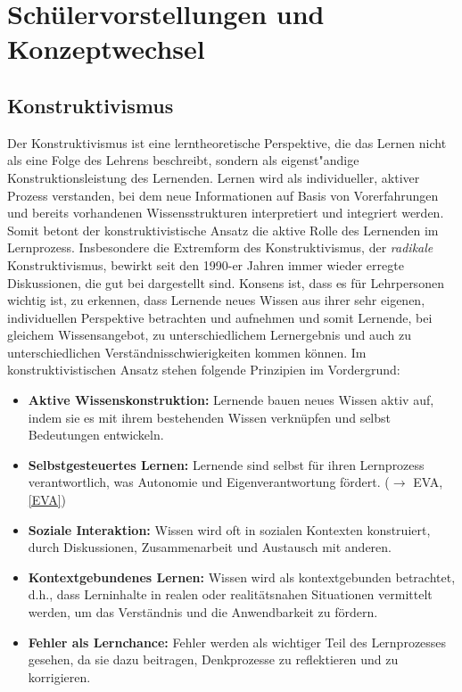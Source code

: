 \chapter{Sch{\"u}lervorstellungen und Konzeptwechsel}\label{Schuelervorstellungen}


\section{Konstruktivismus}\label{Konstruktivismus}

Der Konstruktivismus ist eine lerntheoretische Perspektive, die das Lernen nicht als eine Folge des Lehrens beschreibt, sondern als eigenst"{a}ndige Konstruktionsleistung des Lernenden. Lernen wird als individueller, aktiver Prozess verstanden, bei dem neue Informationen auf Basis von Vorerfahrungen und bereits vorhandenen Wissensstrukturen interpretiert und integriert werden. Somit betont der konstruktivistische Ansatz  die aktive Rolle des Lernenden im Lernprozess. Insbesondere die Extremform des Konstruktivismus, der \emph{radikale} Konstruktivismus, bewirkt  seit den 1990-er Jahren immer wieder erregte Diskussionen, die gut bei \textcite{JankMeyer} dargestellt sind. Konsens ist, dass es f\"{u}r Lehrpersonen wichtig ist, zu erkennen, dass Lernende neues Wissen aus ihrer sehr eigenen, individuellen Perspektive betrachten und aufnehmen und somit Lernende, bei gleichem Wissensangebot, zu unterschiedlichem Lernergebnis und auch zu unterschiedlichen Verst\"{a}ndnisschwierigkeiten kommen k\"{o}nnen.
\bip
Im konstruktivistischen Ansatz stehen folgende Prinzipien im Vordergrund:

\begin{itemize}
\item \textbf{Aktive Wissenskonstruktion:} Lernende bauen neues Wissen aktiv auf, indem sie es mit ihrem bestehenden Wissen verkn\"{u}pfen und selbst Bedeutungen entwickeln.
\item \textbf{Selbstgesteuertes Lernen:} Lernende sind selbst f\"{u}r ihren Lernprozess verantwortlich, was Autonomie und Eigenverantwortung f\"{o}rdert. ($\to$ EVA, \cref{EVA})
\item \textbf{Soziale Interaktion:} Wissen wird oft in sozialen Kontexten konstruiert, durch Diskussionen, Zusammenarbeit und Austausch mit anderen.
\item \textbf{Kontextgebundenes Lernen:} Wissen wird als kontextgebunden betrachtet, d.h., dass Lerninhalte in realen oder realit\"{a}tsnahen Situationen vermittelt werden, um das Verst\"{a}ndnis und die Anwendbarkeit zu f\"{o}rdern.
\item \textbf{Fehler als Lernchance:} Fehler werden als wichtiger Teil des Lernprozesses gesehen, da sie dazu beitragen, Denkprozesse zu reflektieren und zu korrigieren.
\end{itemize}

